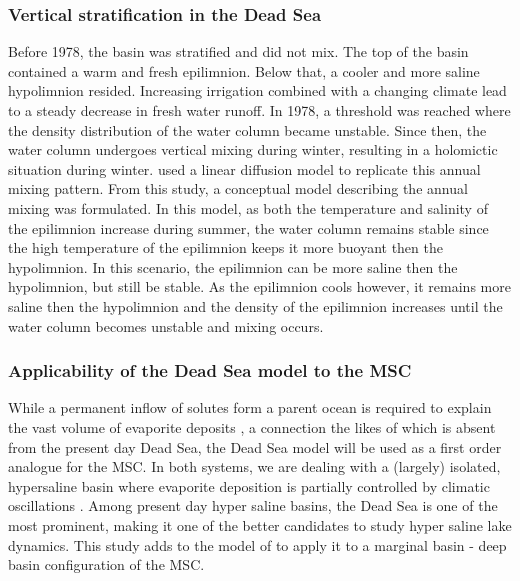 \documentclass[twocolumn]{article}
\begin{document}
\subsubsection{Vertical stratification in the Dead Sea}
\label{sect:Dead_Sea_model}
 Before 1978, the basin was stratified and did not mix. The top of the basin contained a warm and fresh epilimnion. Below that, a cooler and more saline hypolimnion resided. Increasing irrigation combined with a changing climate lead to a steady decrease in fresh water runoff. In 1978, a threshold was reached where the density distribution of the water column became unstable. Since then, the water column undergoes vertical mixing during winter, resulting in a holomictic situation during winter. \cite{Heiden2017Application} used a linear diffusion model to replicate this annual mixing pattern. From this study, a conceptual model describing the annual mixing was formulated. In this model, as both the temperature and salinity of the epilimnion increase during summer, the water column remains stable since the high temperature of the epilimnion keeps it more buoyant then the hypolimnion. In this scenario, the epilimnion can be more saline then the hypolimnion, but still be stable. As the epilimnion cools however, it remains more saline then the hypolimnion and the density of the epilimnion increases until the water column becomes unstable and mixing occurs. 
 
\subsubsection{Applicability of the Dead Sea model to the MSC}
While a permanent inflow of solutes form a parent ocean is required to explain the vast volume of evaporite deposits \citep{garcia2018geochemical}, a connection the likes of which is absent from the present day Dead Sea, the Dead Sea model will be used as a first order analogue for the MSC. In both systems, we are dealing with a (largely) isolated, hypersaline basin where evaporite deposition is partially controlled by climatic oscillations \citep{manzi2012high}. Among present day hyper saline basins, the Dead Sea is one of the most prominent, making it one of the better candidates to study hyper saline lake dynamics. This study adds to the model of \cite{Heiden2017Application} to apply it to a marginal basin - deep basin configuration of the MSC.
\end{document}
